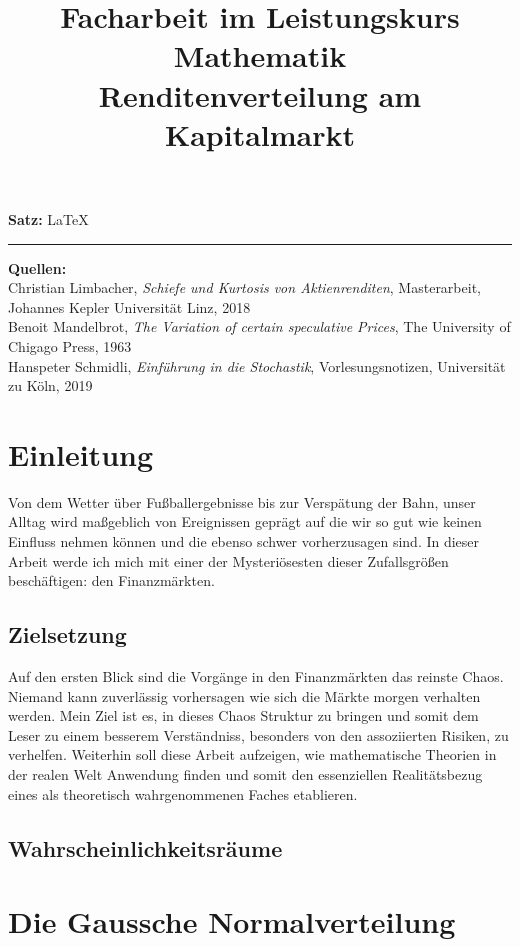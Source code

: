 \documentclass[12pt, a4paper]{report}
\title{\LARGE   Facharbeit im Leistungskurs Mathematik  \vspace*{0.5cm} \\
  \Huge Renditenverteilung am Kapitalmarkt}
\theoremstyle{definition}
\begin{document}
\maketitle
\newpage
\vspace*{\fill}
\begin{normalsize}
\noindent
  \textbf{Satz:}
  \LaTeX
\end{normalsize}
\vspace*{5pt}
\hrule
\vspace{5pt}
\noindent
\textbf{Quellen:}
\\
Christian Limbacher, \textit{Schiefe und Kurtosis von Aktienrenditen}, Masterarbeit, Johannes Kepler Universität Linz, 2018 \\
Benoit Mandelbrot, \textit{The Variation of certain speculative Prices}, The University of Chigago Press, 1963 \\
Hanspeter Schmidli, \textit{Einführung in die Stochastik}, Vorlesungsnotizen, Universität zu Köln, 2019
\tableofcontents
\newpage
\chapter{Einleitung}
Von dem Wetter über Fußballergebnisse bis zur Verspätung der Bahn, unser Alltag wird maßgeblich von Ereignissen geprägt auf die wir so gut wie keinen Einfluss nehmen können und die ebenso schwer vorherzusagen sind. In dieser Arbeit werde ich mich mit einer der Mysteriösesten dieser Zufallsgrößen beschäftigen: den Finanzmärkten.
\section{Zielsetzung}
Auf den ersten Blick sind die Vorgänge in den Finanzmärkten das reinste Chaos. Niemand kann zuverlässig vorhersagen wie sich die Märkte morgen verhalten werden. Mein Ziel ist es, in dieses Chaos Struktur zu bringen und somit dem Leser zu einem besserem Verständniss, besonders von den assoziierten Risiken, zu verhelfen. Weiterhin soll diese Arbeit aufzeigen, wie mathematische Theorien in der realen Welt Anwendung finden und somit den essenziellen Realitätsbezug eines als theoretisch wahrgenommenen Faches etablieren.


\section{Wahrscheinlichkeitsräume}

\chapter{Die Gaussche Normalverteilung}
\end{document}
